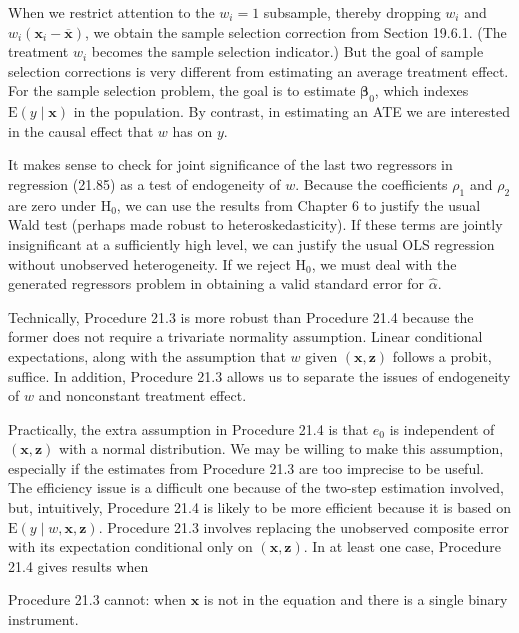 \documentclass[10pt]{article}
\begin{document}
When we restrict attention to the $w_{i}=1$ subsample, thereby dropping $w_{i}$ and $w_{i}\left(\mathbf{x}_{i}-\overline{\mathbf{x}}\right)$, we obtain the sample selection correction from Section 19.6.1. (The treatment $w_{i}$ becomes the sample selection indicator.) But the goal of sample selection corrections is very different from estimating an average treatment effect. For the sample selection problem, the goal is to estimate $\boldsymbol{\beta}_{0}$, which indexes $\mathrm{E}(y \mid \mathbf{x})$ in the population. By contrast, in estimating an ATE we are interested in the causal effect that $w$ has on $y$.

It makes sense to check for joint significance of the last two regressors in regression (21.85) as a test of endogeneity of $w$. Because the coefficients $\rho_{1}$ and $\rho_{2}$ are zero under $\mathrm{H}_{0}$, we can use the results from Chapter 6 to justify the usual Wald test (perhaps made robust to heteroskedasticity). If these terms are jointly insignificant at a sufficiently high level, we can justify the usual OLS regression without unobserved heterogeneity. If we reject $\mathrm{H}_{0}$, we must deal with the generated regressors problem in obtaining a valid standard error for $\hat{\alpha}$.

Technically, Procedure 21.3 is more robust than Procedure 21.4 because the former does not require a trivariate normality assumption. Linear conditional expectations, along with the assumption that $w$ given $(\mathbf{x}, \mathbf{z})$ follows a probit, suffice. In addition, Procedure 21.3 allows us to separate the issues of endogeneity of $w$ and nonconstant treatment effect.

Practically, the extra assumption in Procedure 21.4 is that $e_{0}$ is independent of $(\mathbf{x}, \mathbf{z})$ with a normal distribution. We may be willing to make this assumption, especially if the estimates from Procedure 21.3 are too imprecise to be useful. The efficiency issue is a difficult one because of the two-step estimation involved, but, intuitively, Procedure 21.4 is likely to be more efficient because it is based on $\mathrm{E}(y \mid w, \mathbf{x}, \mathbf{z})$. Procedure 21.3 involves replacing the unobserved composite error with its expectation conditional only on $(\mathbf{x}, \mathbf{z})$. In at least one case, Procedure 21.4 gives results when

Procedure 21.3 cannot: when $\mathbf{x}$ is not in the equation and there is a single binary instrument.
\end{document}
